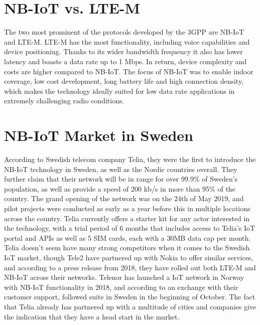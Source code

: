 \section{NB-IoT vs. LTE-M}
The two most prominent of the protocols developed by the 3GPP are NB-IoT and LTE-M. LTE-M has the most functionality, including voice capabilities and device positioning. Thanks to its wider bandwidth frequency it also has lower latency and boasts a data rate up to 1 Mbps.\cite{ericsson-blog} In return, device complexity and costs are higher compared to NB-IoT. The focus of NB-IoT was to enable indoor coverage, low cost development, long battery life and high connection density, which makes the technology ideally suited for low data rate applications in extremely challenging radio conditions. 

\section{NB-IoT Market in Sweden}
According to Swedish telecom company Telia, they were the first to introduce the NB-IoT technology in Sweden, as well as the Nordic countries overall.\cite{telia-nb} They further claim that their network will be in range for over 99.9\% of Sweden's population, as well as provide a speed of 200 kb/s in more than 95\% of the country.\cite{telia-first} The grand opening of the network was on the 24th of May 2019, and pilot projects were conducted as early as a year before this in multiple locations across the country. Telia currently offers a starter kit  for any actor interested in the technology, with a trial period of 6 months that includes access to Telia's IoT portal and APIs as well as 5 SIM cards, each with a 30MB data cap per month. Telia doesn't seem have many strong competitors when it comes to the Swedish IoT market, though Tele2 have partnered up with Nokia to offer similar services, and according to a press release from 2018, they have rolled out both LTE-M and NB-IoT across their networks.\cite{tele2-nokia} Telenor has launched a IoT network in Norway with NB-IoT functionality in 2018\cite{telenor-iot}, and according to an exchange with their customer support, followed suite in Sweden in the beginning of October. The fact that Telia already has partnered up with a multitude of cities and companies give the indication that they have a head start in the market.